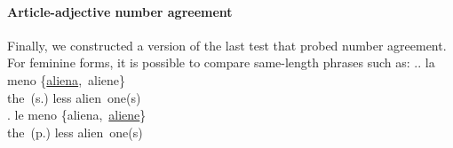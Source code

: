 

\paragraph{Article-adjective number agreement}
Finally, we constructed a version of the last test that probed number agreement. For feminine forms, it is possible to compare same-length phrases such as:
\ex.\ag. la meno \{\underline{aliena},\ aliene\} \\
the\ (s.) less alien\ one(s) \\
\bg. le meno \{aliena,\ \underline{aliene}\} \\
the\ (p.) less alien\ one(s) \\

